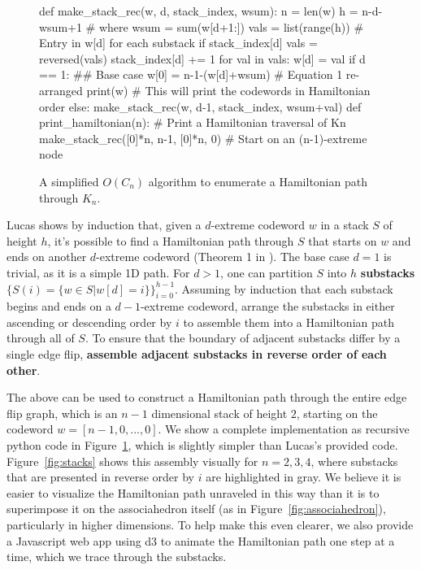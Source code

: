 \documentclass[english]{socg-lipics-v2021}
\begin{document}
\begin{figure}
    \begin{python}
def make_stack_rec(w, d, stack_index, wsum): 
    n = len(w)
    h = n-d-wsum+1 # where wsum = sum(w[d+1:])
    vals = list(range(h)) # Entry in w[d] for each substack
    if stack_index[d]%
        vals = reversed(vals)
    stack_index[d] += 1
    for val in vals:
        w[d] = val
        if d == 1: ## Base case
            w[0] = n-1-(w[d]+wsum) # Equation 1 re-arranged
            print(w) # This will print the codewords in Hamiltonian order
        else:
            make_stack_rec(w, d-1, stack_index, wsum+val)
def print_hamiltonian(n): # Print a Hamiltonian traversal of Kn
    make_stack_rec([0]*n, n-1, [0]*n, 0) # Start on an (n-1)-extreme node
        \end{python}
    \caption{A simplified $O(C_n)$ algorithm to enumerate a Hamiltonian path through $K_n$.}
    \label{fig:algorithm}
\end{figure}

Lucas shows by induction that, given a $d$-extreme codeword $w$ in a stack $S$ of height $h$, it's possible to find a Hamiltonian path through $S$ that starts on $w$ and ends on another $d$-extreme codeword (Theorem 1 in \cite{lucas1987rotation}). The base case $d=1$ is trivial, as it is a simple 1D path.  For $d > 1$, one can partition $S$ into $h$ {\bf substacks} $\{S(i) = \{w \in S | w[d] = i\} \}_{i=0}^{h-1}$.  Assuming by induction that each substack begins and ends on a $d-1$-extreme codeword, arrange the substacks in either ascending or descending order by $i$ to assemble them into a Hamiltonian path through all of $S$.  To ensure that the boundary of adjacent substacks differ by a single edge flip, \textbf{assemble adjacent substacks in reverse order of each other}.  

The above can be used to construct a Hamiltonian path through the entire edge flip graph, which is an $n-1$ dimensional stack of height $2$, starting on the codeword $w = [n-1, 0, ..., 0]$.  We show a complete implementation as recursive python code in Figure~\ref{fig:algorithm}, which is slightly simpler than Lucas's provided code.  Figure~\ref{fig:stacks} shows this assembly visually for $n=2,3,4$, where substacks that are presented in reverse order by $i$ are highlighted in gray.  We believe it is easier to visualize the Hamiltonian path unraveled in this way than it is to superimpose it on the associahedron itself (as in Figure~\ref{fig:associahedron}), particularly in higher dimensions.  To help make this even clearer, we also provide a Javascript web app using d3 \cite{bostock2011d3} to animate the Hamiltonian path one step at a time, which we trace through the substacks.
\end{document}
